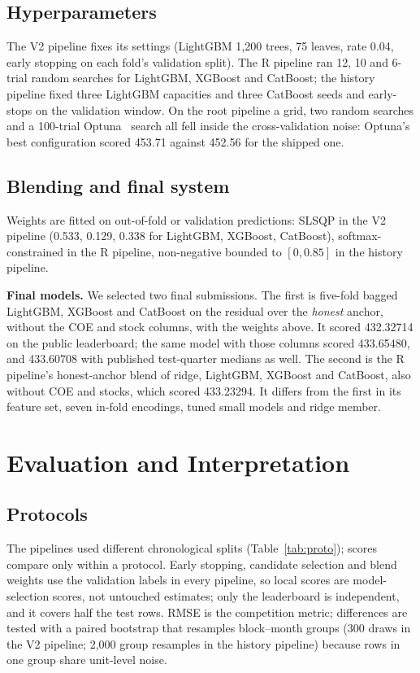 \documentclass[conference]{IEEEtran}
\newif\ifshowsrc
\newcommand{\src}[1]{\ifshowsrc\textsuperscript{\tiny\color{gray}[#1]}\fi}
\begin{document}
\subsection{Hyperparameters}
The V2 pipeline fixes its settings (LightGBM 1,200 trees, 75 leaves, rate 0.04, early stopping on each fold's validation split).\src{Aa-hp} The R pipeline ran 12, 10 and 6-trial random searches for LightGBM, XGBoost and CatBoost;\src{Be-hp} the history pipeline fixed three LightGBM capacities and three CatBoost seeds and early-stops on the validation window.\src{Pu-hp} On the root pipeline a grid, two random searches and a 100-trial Optuna~\cite{optuna} search all fell inside the cross-validation noise: Optuna's best configuration scored 453.71 against 452.56 for the shipped one.\src{Aa-optuna}

\subsection{Blending and final system}
Weights are fitted on out-of-fold or validation predictions: SLSQP in the V2 pipeline (0.533, 0.129, 0.338 for LightGBM, XGBoost, CatBoost),\src{Aa-w} softmax-constrained in the R pipeline,\src{Be-blend} non-negative bounded to $[0,0.85]$ in the history pipeline.\src{Pu-blend}

\textbf{Final models.} We selected two final submissions. The first is five-fold bagged LightGBM, XGBoost and CatBoost on the residual over the \emph{honest} anchor, without the COE and stock columns, with the weights above. It scored 432.32714 on the public leaderboard; the same model with those columns scored 433.65480, and 433.60708 with published test-quarter medians as well.\src{Aa-final,Aa-honest-lb,Aa-coe-lb} The second is the R pipeline's honest-anchor blend of ridge, LightGBM, XGBoost and CatBoost, also without COE and stocks, which scored 433.23294. It differs from the first in its feature set, seven in-fold encodings, tuned small models and ridge member.\src{Be-final}

\section{Evaluation and Interpretation}
\subsection{Protocols}
The pipelines used different chronological splits (Table~\ref{tab:proto}); scores compare only within a protocol. Early stopping, candidate selection and blend weights use the validation labels in every pipeline, so local scores are model-selection scores, not untouched estimates; only the leaderboard is independent, and it covers half the test rows.\src{Pu-sel,Me-sel} RMSE is the competition metric; differences are tested with a paired bootstrap that resamples block--month groups (300 draws in the V2 pipeline; 2,000 group resamples in the history pipeline) because rows in one group share unit-level noise.\src{Aa-boot,Pu-noise}
\end{document}
